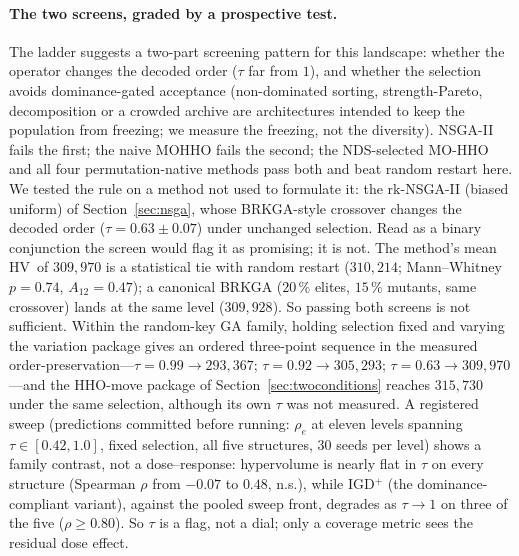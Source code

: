 \documentclass[runningheads]{llncs}
\newcommand{\HV}{\textsf{HV}}
\newcommand{\IGD}{\textsf{IGD}}
\begin{document}
\paragraph{The two screens, graded by a prospective test.}
The ladder suggests a two-part screening pattern for this landscape: whether the operator changes the decoded order ($\tau$ far from $1$), and whether the selection avoids dominance-gated acceptance (non-dominated sorting, strength-Pareto, decomposition or a crowded archive are architectures intended to keep the population from freezing; we measure the freezing, not the diversity). NSGA-II fails the first; the naive MOHHO fails the second; the NDS-selected MO-HHO and all four permutation-native methods pass both and beat random restart here. We tested the rule on a method not used to formulate it: the rk-NSGA-II (biased uniform) of Section~\ref{sec:nsga}, whose BRKGA-style crossover changes the decoded order ($\tau=0.63\pm0.07$) under unchanged selection. Read as a binary conjunction the screen would flag it as promising; it is not. The method's mean \HV\ of $309{,}970$ is a statistical tie with random restart ($310{,}214$; Mann--Whitney $p=0.74$, $A_{12}=0.47$); a canonical BRKGA ($20\,\%$ elites, $15\,\%$ mutants, same crossover) lands at the same level ($309{,}928$). So passing both screens is not sufficient. Within the random-key GA family, holding selection fixed and varying the variation package gives an ordered three-point sequence in the measured order-preservation---$\tau{=}0.99\!\to\!293{,}367$; $\tau{=}0.92\!\to\!305{,}293$; $\tau{=}0.63\!\to\!309{,}970$---and the HHO-move package of Section~\ref{sec:twoconditions} reaches $315{,}730$ under the same selection, although its own $\tau$ was not measured. A registered sweep (predictions committed before running: $\rho_e$ at eleven levels spanning $\tau\in[0.42,1.0]$, fixed selection, all five structures, 30 seeds per level) shows a family contrast, not a dose--response: hypervolume is nearly flat in $\tau$ on every structure (Spearman $\rho$ from $-0.07$ to $0.48$, n.s.), while \IGD$^{+}$ (the dominance-compliant variant), against the pooled sweep front, degrades as $\tau\to1$ on three of the five ($\rho\ge0.80$). So $\tau$ is a flag, not a dial; only a coverage metric sees the residual dose effect.
\end{document}
